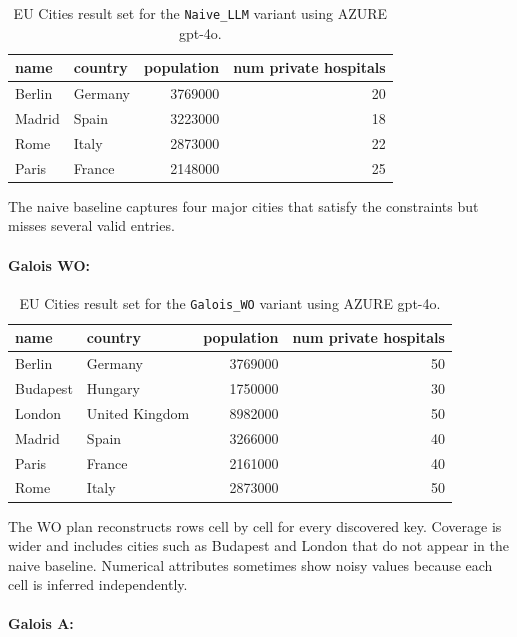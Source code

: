 \documentclass[11pt]{article}
\begin{document}
\begin{table}[h]
\centering
\begin{tabular}{l l r r}
\toprule
name   & country & population & num private hospitals \\
\midrule
Berlin & Germany & 3769000 & 20 \\
Madrid & Spain   & 3223000 & 18 \\
Rome   & Italy   & 2873000 & 22 \\
Paris  & France  & 2148000 & 25 \\
\bottomrule
\end{tabular}
\caption{EU Cities result set for the \texttt{Naive\_LLM} variant using AZURE gpt-4o.}
\end{table}

The naive baseline captures four major cities that satisfy the constraints but misses several valid entries.

\paragraph{Galois WO:}

\begin{table}[h]
\centering
\begin{tabular}{l l r r}
\toprule
name     & country          & population & num private hospitals \\
\midrule
Berlin   & Germany          & 3769000 & 50 \\
Budapest & Hungary          & 1750000 & 30 \\
London   & United Kingdom   & 8982000 & 50 \\
Madrid   & Spain            & 3266000 & 40 \\
Paris    & France           & 2161000 & 40 \\
Rome     & Italy            & 2873000 & 50 \\
\bottomrule
\end{tabular}
\caption{EU Cities result set for the \texttt{Galois\_WO} variant using AZURE gpt-4o.}
\end{table}

The WO plan reconstructs rows cell by cell for every discovered key. Coverage is wider and includes cities such as Budapest and London that do not appear in the naive baseline. Numerical attributes sometimes show noisy values because each cell is inferred independently.

\paragraph{Galois A:}
\end{document}
